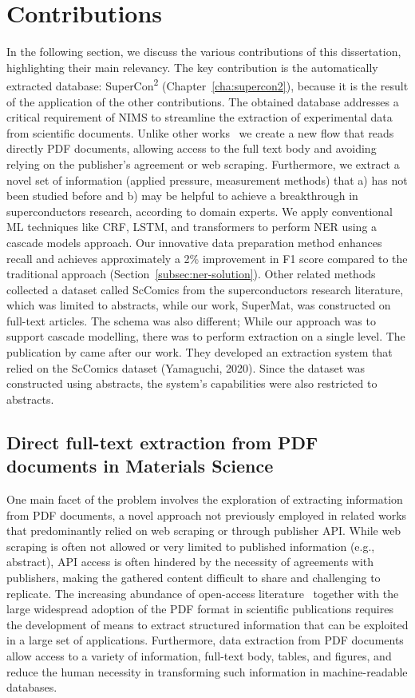 \section{Contributions}
In the following section, we discuss the various contributions of this dissertation, highlighting their main relevancy. 
The key contribution is the automatically extracted database: SuperCon\textsuperscript{2} (Chapter~\ref{cha:supercon2}), because it is the result of the application of the other contributions. 
The obtained database addresses a critical requirement of NIMS to streamline the extraction of experimental data from scientific documents.  
Unlike other works~\cite{court2020magnetic} we create a new flow that reads directly PDF documents, allowing access to the full text body and avoiding relying on the publisher's agreement or web scraping. Furthermore, we extract a novel set of information (applied pressure, measurement methods) that a) has not been studied before and b) may be helpful to achieve a breakthrough in superconductors research, according to domain experts.  
We apply conventional ML techniques like CRF, LSTM, and transformers to perform NER using a cascade models approach. Our innovative data preparation method enhances recall and achieves approximately a 2\% improvement in F1 score compared to the traditional approach (Section~\ref{subsec:ner-solution}).
Other related methods \cite{yamaguchi-etal-2020-sc} collected a dataset called ScComics from the superconductors research literature, which was limited to abstracts, while our work, SuperMat, was constructed on full-text articles. The schema was also different; While our approach was to support cascade modelling, there was to perform extraction on a single level.  
The publication by \cite{mitsui2023automatic} came after our work. They developed an extraction system that relied on the ScComics dataset (Yamaguchi, 2020). Since the dataset was constructed using abstracts, the system's capabilities were also restricted to abstracts.

\subsection{Direct full-text extraction from PDF documents in Materials Science}
One main facet of the problem involves the exploration of extracting information from PDF documents, a novel approach not previously employed in related works that predominantly relied on web scraping or through publisher API.
While web scraping is often not allowed or very limited to published information (e.g., abstract), API access is often hindered by the necessity of agreements with publishers, making the gathered content difficult to share and challenging to replicate.
The increasing abundance of open-access literature~\cite{laakso2011the} together with the large widespread adoption of the PDF format in scientific publications requires the development of means to extract structured information that can be exploited in a large set of applications. 
Furthermore, data extraction from PDF documents allow access to a variety of information, full-text body, tables, and figures, and reduce the human necessity in transforming such information in machine-readable databases.

